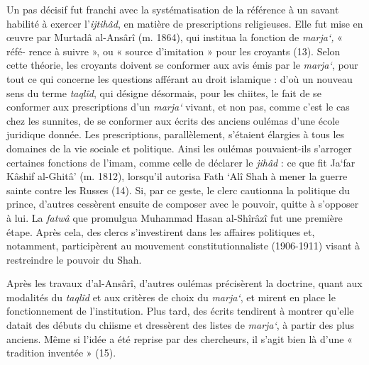 Un pas décisif fut franchi avec la systématisation de la référence à un
savant habilité à exercer l'\emph{ijtihâd}, en matière de prescriptions
religieuses. Elle fut mise en œuvre par Murtadâ al-Ansârî (m. 1864), qui
institua la fonction de \emph{marja`,} « réfé- rence à suivre », ou «
source d'imitation » pour les croyants (13). Selon cette théorie, les
croyants doivent se conformer aux avis émis par le \emph{marja`}, pour
tout ce qui concerne les questions afférant au droit islamique : d'où un
nouveau sens du terme \emph{taqlîd}, qui désigne désormais, pour les
chiites, le fait de se conformer aux prescriptions d'un \emph{marja`}
vivant, et non pas, comme c'est le cas chez les sunnites, de se
conformer aux écrits des anciens oulémas d'une école juridique donnée.
Les prescriptions, parallèlement, s'étaient élargies à tous les domaines
de la vie sociale et politique. Ainsi les oulémas pouvaient-ils
s'arroger certaines fonctions de l'imam, comme celle de déclarer le
\emph{jihâd} : ce que fit Ja`far Kâshif al-Ghitâ' (m. 1812), lorsqu'il
autorisa Fath `Alî Shah à mener la guerre sainte contre les
Russes (14). Si, par ce geste, le clerc cautionna la politique du
prince, d'autres cessèrent ensuite de composer avec le pouvoir, quitte à
s'opposer à lui. La \emph{fatwâ} que promulgua Muhammad Hasan al-Shîrâzî
fut une première étape. Après cela, des clercs s'investirent dans les
affaires politiques et, notamment, participèrent au mouvement
constitutionnaliste (1906-1911) visant à restreindre le pouvoir du Shah.

Après les travaux d'al-Ansârî, d'autres oulémas précisèrent la doctrine,
quant aux modalités du \emph{taqlîd} et aux critères de choix du
\emph{marja`}, et mirent en place le fonctionnement de l'institution.
Plus tard, des écrits tendirent à montrer qu'elle datait des débuts du
chiisme et dressèrent des listes de \emph{marja`}, à partir des plus
anciens. Même si l'idée a été reprise par des chercheurs, il s'agit bien
là d'une
« tradition inventée » (15).

